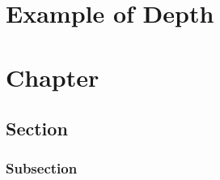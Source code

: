 \documentclass{depth_ebook}
\begin{document}
\chapter*{Example of Depth}
\blindtext[2]

\chapter{Chapter}
\blindtext[2]
\section{Section}
\blindtext[2]
\subsection{Subsection}
\blindtext[2]
\end{document}
